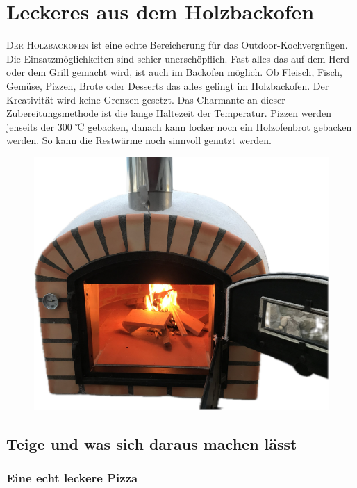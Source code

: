 \chapter{Leckeres aus dem Holzbackofen}\label{Chapter4}
\lettrine[lines=3]{D}{er Holzbackofen} ist eine echte Bereicherung für das 
Outdoor-Kochvergnügen.
Die Einsatzmöglichkeiten sind schier unerschöpflich. Fast alles das auf
dem Herd oder dem Grill gemacht wird, ist auch im Backofen möglich. Ob
Fleisch, Fisch, Gemüse, Pizzen, Brote oder Desserts das alles gelingt im 
Holzbackofen. Der Kreativität wird keine Grenzen gesetzt. Das Charmante an
dieser Zubereitungsmethode ist die lange Haltezeit der Temperatur. Pizzen
werden jenseits der 300 ℃ gebacken, danach kann locker noch ein 
Holzofenbrot gebacken werden. So kann die Restwärme noch sinnvoll genutzt
werden.

\begin{figure}[htbp]
	\centering
	\begin{minipage}{1\textwidth}
		\centering
		\includegraphics[width=.9\linewidth]{pics/Backofen}
		\label{fig:Backofen}
	\end{minipage}
\end{figure}
\newpage

\section{Teige und was sich daraus machen lässt}

\subsection{Eine echt leckere Pizza}

